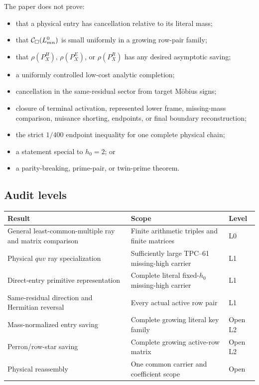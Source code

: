 The paper does not prove:
\begin{itemize}
 \item that a physical entry has cancellation relative to its literal
       mass;
 \item that \(\mathcal C_\square(L_{mn}^{0})\) is small uniformly in a growing
       row-pair family;
 \item that \(\rho(P_X^H)\), \(\rho(P_X^E)\), or
       \(\rho(P_X^R)\) has any desired asymptotic saving;
 \item a uniformly controlled low-cost analytic completion;
 \item cancellation in the same-residual sector from target M\"obius
       signs;
 \item closure of terminal activation, represented lower frame,
       missing-mass comparison, nuisance shorting, endpoints, or final
       boundary reconstruction;
 \item the strict \(1/400\) endpoint inequality for one complete physical
       chain;
 \item a statement special to \(h_0=2\); or
 \item a parity-breaking, prime-pair, or twin-prime theorem.
\end{itemize}

\subsection{Audit levels}

\begin{center}
\begin{tabular}{@{}
 >{\raggedright\arraybackslash}p{}
 >{\raggedright\arraybackslash}p{}
 >{\raggedright\arraybackslash}p{}@{}}
\toprule
Result & Scope & Level\\
\midrule
General least-common-multiple ray and matrix comparison &
Finite arithmetic triples and finite matrices & L0\\
Physical \(quv\) ray specialization &
Sufficiently large TPC--61 missing-high carrier & L1\\
Direct-entry primitive representation &
Complete literal fixed-\(h_0\) missing-high carrier & L1\\
Same-residual direction and Hermitian reversal &
Every actual active row pair & L1\\
Mass-normalized entry saving &
Complete growing literal key family & Open L2\\
Perron/row-star saving &
Complete growing active-row matrix & Open L2\\
Physical reassembly &
One common carrier and coefficient scope & Open\\
\bottomrule
\end{tabular}
\end{center}

